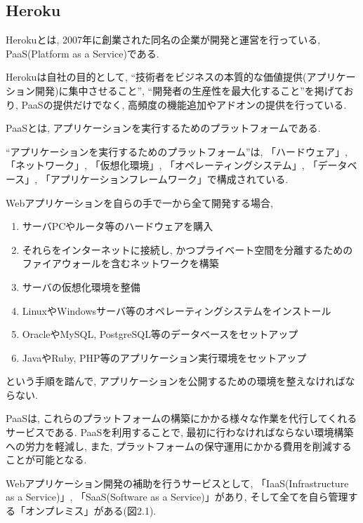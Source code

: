 \subsection{Heroku}
Herokuとは, 2007年に創業された同名の企業が開発と運営を行っている, PaaS(Platform as a Service)である.

Herokuは自社の目的として, “技術者をビジネスの本質的な価値提供(アプリケーション開発)に集中させること”, “開発者の生産性を最大化すること”を掲げており, PaaSの提供だけでなく, 高頻度の機能追加やアドオンの提供を行っている.

PaaSとは, アプリケーションを実行するためのプラットフォームである.

“アプリケーションを実行するためのプラットフォーム”は, 「ハードウェア」, 「ネットワーク」, 「仮想化環境」, 「オペレーティングシステム」, 「データベース」, 「アプリケーションフレームワーク」で構成されている.

Webアプリケーションを自らの手で一から全て開発する場合,
\begin{enumerate}
\item サーバPCやルータ等のハードウェアを購入

\item それらをインターネットに接続し, かつプライベート空間を分離するためのファイアウォールを含むネットワークを構築

\item サーバの仮想化環境を整備

\item LinuxやWindowsサーバ等のオペレーティングシステムをインストール

\item OracleやMySQL, PostgreSQL等のデータベースをセットアップ

\item JavaやRuby, PHP等のアプリケーション実行環境をセットアップ
\end{enumerate}

という手順を踏んで, アプリケーションを公開するための環境を整えなければならない.

PaaSは, これらのプラットフォームの構築にかかる様々な作業を代行してくれるサービスである.
PaaSを利用することで, 最初に行わなければならない環境構築への労力を軽減し, また, プラットフォームの保守運用にかかる費用を削減することが可能となる.

Webアプリケーション開発の補助を行うサービスとして, 「IaaS(Infrastructure as a Service)」, 「SaaS(Software as a Service)」があり, そして全てを自ら管理する「オンプレミス」がある(図2.1).

